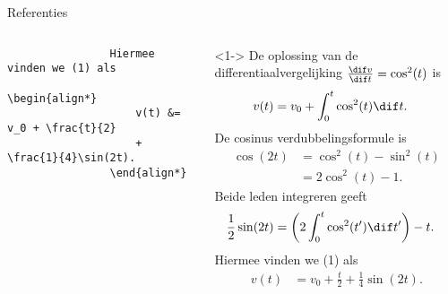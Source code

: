 \begin{frame}[fragile,t]{Referenties}
\begin{columns}[t]
\begin{column}{0.5\textwidth}
\begin{verbatim}
                Hiermee vinden we (1) als
                \begin{align*}
                    v(t) &= v_0 + \frac{t}{2}
                    + \frac{1}{4}\sin(2t).
                \end{align*}
            \end{verbatim}
        \end{column}
        \begin{column}{0.5\textwidth}
            \begin{adjustbox}{frame=1pt 10pt,valign=t}%
                \begin{minipage}{\textwidth-22pt}
                    \begin{onlyenv}<1->%
                        {\tiny\setlength{\abovedisplayskip}{6pt}%
                            \setlength{\belowdisplayskip}{6pt}%
                            \setlength{\abovedisplayshortskip}{0pt}%
                            \setlength{\belowdisplayshortskip}{0pt}%
                            \setcounter{equation}{0}%
                            De oplossing van de differentiaalvergelijking $ \frac{\dif v}{\dif t} = \cos^2(t) $ is
                            \begin{align}
                                v(t) & = v_0 + \int_{0}^{t}\cos^2(t)\dif t.
                            \end{align}
                            De cosinus verdubbelingsformule is
                            \begin{align*}
                                \cos(2t) & = \cos^2(t) - \sin^2(t) \\
                                         & = 2\cos^2(t)-1.
                            \end{align*}
                            Beide leden integreren geeft
                            \begin{align*}
                                \frac{1}{2}\sin(2t) & = \left(2\int_0^t\cos^2(t')\dif t'\right) - t.
                            \end{align*}
                            Hiermee vinden we (1) als
                            \begin{align*}
                                v(t) & = v_0 + \frac{t}{2} + \frac{1}{4}\sin(2t).
                            \end{align*}
                        }%
                    \end{onlyenv}%
                \end{minipage}
            \end{adjustbox}
        \end{column}
    \end{columns}
\end{frame}

